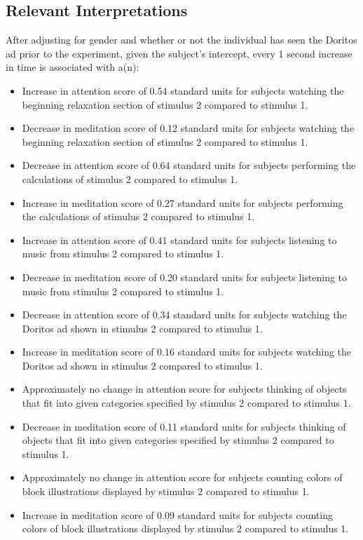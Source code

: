 \documentclass{article}[12pt]
\begin{document}


\newpage
\subsection{Relevant Interpretations}

\noindent After adjusting for gender and whether or not the individual has seen the Doritos ad prior to the experiment, given the subject's intercept, every 1 second increase in time is associated with a(n): 
\begin{itemize}
\item Increase in attention score of 0.54 standard units for subjects watching the beginning relaxation section of stimulus 2 compared to stimulus 1.
\item Decrease in meditation score of 0.12 standard units for subjects watching the beginning relaxation section of stimulus 2 compared to stimulus 1.
\item Decrease in attention score of 0.64 standard units for subjects performing the calculations of stimulus 2 compared to stimulus 1.
\item Increase in meditation score of 0.27 standard units for subjects performing the calculations of stimulus 2 compared to stimulus 1.
\item Increase in attention score of 0.41 standard units for subjects listening to music from stimulus 2 compared to stimulus 1.
\item Decrease in meditation score of 0.20 standard units for subjects listening to music from stimulus 2 compared to stimulus 1.
\item Decrease in attention score of 0.34 standard units for subjects watching the Doritos ad shown in stimulus 2 compared to stimulus 1.
\item Increase in meditation score of 0.16 standard units for subjects watching the Doritos ad shown in stimulus 2 compared to stimulus 1.
\item Approximately no change in attention score for subjects thinking of objects that fit into given categories specified by stimulus 2 compared to stimulus 1.
\item Decrease in meditation score of 0.11 standard units for subjects thinking of objects that fit into given categories specified by stimulus 2 compared to stimulus 1.
\item Approximately no change in attention score for subjects counting colors of block illustrations displayed by stimulus 2 compared to stimulus 1.
\item Increase in meditation score of 0.09 standard units for subjects counting colors of block illustrations displayed by stimulus 2 compared to stimulus 1.
\end{itemize}
\end{document}
